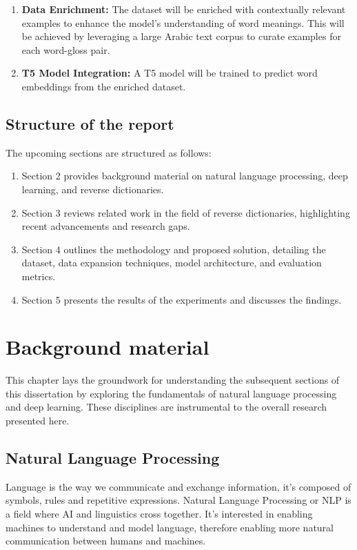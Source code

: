 \documentclass[15pt]{article}
\begin{document}
\begin{enumerate}
    \item \textbf{Data Enrichment:} The dataset will be enriched with contextually relevant examples to enhance the model's understanding of word meanings. This will be achieved by leveraging a large Arabic text corpus to curate examples for each word-gloss pair.
    \item \textbf{T5 Model Integration:} A T5 model will be trained to predict word embeddings from the enriched dataset.
\end{enumerate}

\newpage

\subsection{Structure of the report}

The upcoming sections are structured as follows:

\begin{enumerate}
    \item Section 2 provides background material on natural language processing, deep learning, and reverse dictionaries.
    \item Section 3 reviews related work in the field of reverse dictionaries, highlighting recent advancements and research gaps.
    \item Section 4 outlines the methodology and proposed solution, detailing the dataset, data expansion techniques, model architecture, and evaluation metrics.
    \item Section 5 presents the results of the experiments and discusses the findings.
\end{enumerate}

\newpage

\section{Background material}

This chapter lays the groundwork for understanding the subsequent sections of this dissertation by exploring the fundamentals of natural language processing and deep learning. These disciplines are instrumental to the overall research presented here.

\subsection{Natural Language Processing}
Language is the way we communicate and exchange information, it’s composed of symbols, rules and repetitive expressions. Natural Language Processing or NLP is a field where AI and linguistics cross together. It's interested in enabling machines to understand and model language, therefore enabling more natural communication between humans and machines.
\end{document}
